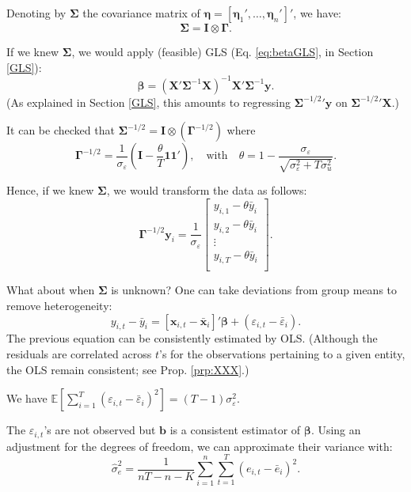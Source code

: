 \documentclass[
  12pt,
]{book}
\theoremstyle{definition}
\theoremstyle{definition}
\theoremstyle{definition}
\theoremstyle{definition}
\theoremstyle{remark}
\begin{document}
Denoting by \(\boldsymbol\Sigma\) the covariance matrix of \(\boldsymbol\eta = [\boldsymbol\eta_1',\dots,\boldsymbol\eta_n']'\), we have:
\[
\boldsymbol\Sigma = \mathbf{I} \otimes \boldsymbol\Gamma.
\]

If we knew \(\boldsymbol\Sigma\), we would apply (feasible) GLS (Eq. \eqref{eq:betaGLS}, in Section \ref{GLS}):
\[
\boldsymbol\beta = (\mathbf{X}'\boldsymbol\Sigma^{-1}\mathbf{X})^{-1}\mathbf{X}'\boldsymbol\Sigma^{-1}\mathbf{y}.
\]
(As explained in Section \ref{GLS}, this amounts to regressing \({\boldsymbol\Sigma^{-1/2}}'\mathbf{y}\) on \({\boldsymbol\Sigma^{-1/2}}'\mathbf{X}\).)

It can be checked that \(\boldsymbol\Sigma^{-1/2} = \mathbf{I} \otimes (\boldsymbol\Gamma^{-1/2})\) where
\[
\boldsymbol\Gamma^{-1/2} = \frac{1}{\sigma_\varepsilon}\left( \mathbf{I} - \frac{\theta}{T}\mathbf{1}\mathbf{1}'\right),\quad \mbox{with}\quad\theta = 1 - \frac{\sigma_\varepsilon}{\sqrt{\sigma_\varepsilon^2+T\sigma_u^2}}.
\]

Hence, if we knew \(\boldsymbol\Sigma\), we would transform the data as follows:
\[
\boldsymbol\Gamma^{-1/2}\mathbf{y}_i = \frac{1}{\sigma_\varepsilon}\left[\begin{array}{c}y_{i,1} - \theta\bar{y}_i\\y_{i,2} - \theta\bar{y}_i\\\vdots\\y_{i,T} - \theta\bar{y}_i\\\end{array}\right].
\]

What about when \(\boldsymbol\Sigma\) is unknown? One can take deviations from group means to remove heterogeneity:
\[
y_{i,t} - \bar{y}_i = [\mathbf{x}_{i,t} - \bar{\mathbf{x}}_i]'\boldsymbol\beta + (\varepsilon_{i,t} - \bar{\varepsilon}_i).
\]
The previous equation can be consistently estimated by OLS. (Although the residuals are correlated across \(t\)'s for the observations pertaining to a given entity, the OLS remain consistent; see Prop. \ref{prp:XXX}.)

We have \(\mathbb{E}\left[\sum_{i=1}^{T}(\varepsilon_{i,t}-\bar{\varepsilon}_i)^2\right] = (T-1)\sigma_{\varepsilon}^2\).

The \(\varepsilon_{i,t}\)'s are not observed but \(\mathbf{b}\) is a consistent estimator of \(\boldsymbol\beta\). Using an adjustment for the degrees of freedom, we can approximate their variance with:
\[
\hat{\sigma}_e^2 = \frac{1}{nT-n-K}\sum_{i=1}^{n}\sum_{t=1}^{T}(e_{i,t} - \bar{e}_i)^2.
\]
\end{document}

